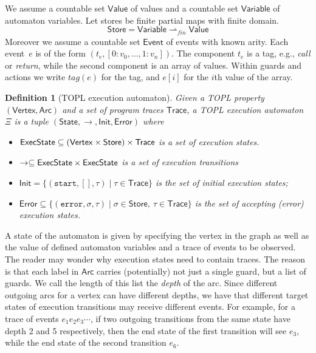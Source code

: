 \documentclass{sigplanconf}[10pt] %
\newcommand{\pmap}{\rightharpoonup}
\newcommand{\set}[1]{\ensuremath{\mathsf{#1}}}
\newtheorem{definition}{Definition}
\begin{document}
We assume a countable set \set{Value} of values and a countable set $\set{Variable}$ of automaton variables.
Let stores be finite partial maps with finite domain.
\[
\set{Store} = \set{Variable} \pmap_{\mathit{fin}} \set{Value}
\]
Moreover we assume a countable set \set{Event} of events with known arity.
Each event~$e$ is of the form $(t_e,[0{:} v_0,\dots, 1{:}v_n])$.
The component $t_e$ is a tag, e.g., {\em call} or {\em return}, while the second component is an array of values.
Within guards and actions we write $tag(e)$ for the tag, and $e[i]$ for the $i$th value of the array.
%
\begin{definition}[TOPL execution automaton]
Given a TOPL property $(\set{Vertex},\set{Arc})$ and a set of program traces $\set{Trace}$, a {\em TOPL execution automaton} $\Xi$ is a tuple
$(\set{State}, \to , \set{Init}, \set{Error})$ where
\begin{itemize}
\item $\set{\World} \subseteq (\set{Vertex}\times \set{Store})\times\set{Trace}$ is a set of {\em execution states}.
\item $\to \subseteq \set{\World} \times \set{\World}$ is a set of {\em execution transitions}
\item $\set{Init}= \{ (\texttt{start}, [], \tau) \mid \tau \in \set{Trace} \}$ is the set of initial execution states;
\item $\set{Error} \subseteq \{ (\texttt{error}, \sigma, \tau) \mid \sigma \in \set{Store},  \ \tau \in \set{Trace} \}$ is the set of accepting (error) execution states.
\end{itemize}
\end{definition}
A state of the automaton is given by specifying the vertex in the graph as well as the value of defined automaton variables and a trace of events to be observed.
The reader may wonder why execution states need to contain traces.
The reason is that each label in $\set{Arc}$ carries (potentially) not
just a single guard, but a list of guards. We call the length of this list the \emph{depth} of the arc.
Since different outgoing arcs for a vertex can have different depths, we have that different target states of execution transitions may receive different events.
For example, for a trace of events $e_1 e_2 e_3\cdots$, if two outgoing transitions from the same state have depth 2 and 5 respectively, then the end state of the first transition will see $e_3$, while the end state of the second transition $e_6$.
\end{document}
